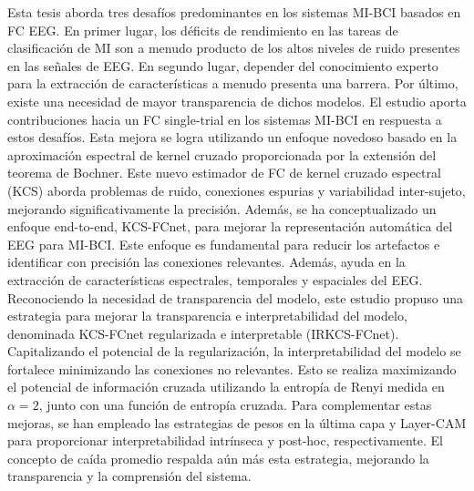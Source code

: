 Esta tesis aborda tres desafíos predominantes en los sistemas MI-BCI basados en FC EEG. En primer lugar, los déficits de rendimiento en las tareas de clasificación de MI son a menudo producto de los altos niveles de ruido presentes en las señales de EEG. En segundo lugar, depender del conocimiento experto para la extracción de características a menudo presenta una barrera. Por último, existe una necesidad de mayor transparencia de dichos modelos. El estudio aporta contribuciones hacia un FC single-trial en los sistemas MI-BCI en respuesta a estos desafíos. Esta mejora se logra utilizando un enfoque novedoso basado en la aproximación espectral de kernel cruzado proporcionada por la extensión del teorema de Bochner. Este nuevo estimador de FC de kernel cruzado espectral (KCS) aborda problemas de ruido, conexiones espurias y variabilidad inter-sujeto, mejorando significativamente la precisión. Además, se ha conceptualizado un enfoque end-to-end, KCS-FCnet, para mejorar la representación automática del EEG para MI-BCI. Este enfoque es fundamental para reducir los artefactos e identificar con precisión las conexiones relevantes. Además, ayuda en la extracción de características espectrales, temporales y espaciales del EEG. Reconociendo la necesidad de transparencia del modelo, este estudio propuso una estrategia para mejorar la transparencia e interpretabilidad del modelo, denominada KCS-FCnet regularizada e interpretable (IRKCS-FCnet). Capitalizando el potencial de la regularización, la interpretabilidad del modelo se fortalece minimizando las conexiones no relevantes. Esto se realiza maximizando el potencial de información cruzada utilizando la entropía de Renyi medida en $\alpha=2$, junto con una función de entropía cruzada. Para complementar estas mejoras, se han empleado las estrategias de pesos en la última capa y Layer-CAM para proporcionar interpretabilidad intrínseca y post-hoc, respectivamente. El concepto de caída promedio respalda aún más esta estrategia, mejorando la transparencia y la comprensión del sistema.

